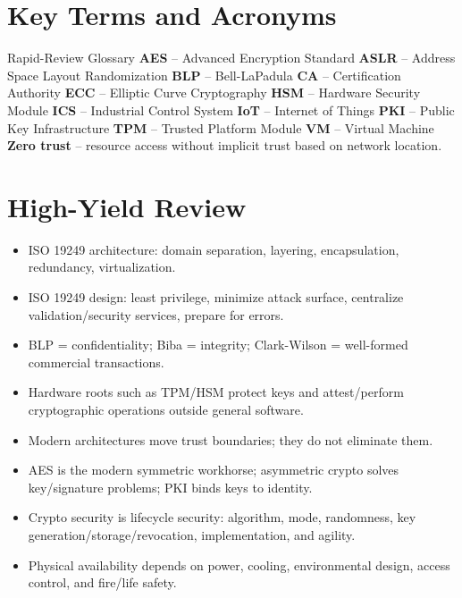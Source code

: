 \documentclass[10pt,letterpaper]{article}
\begin{document}
\section{\color{navy}Key Terms and Acronyms}
\begin{summarybox}{Rapid-Review Glossary}
\textbf{AES} -- Advanced Encryption Standard \quad
\textbf{ASLR} -- Address Space Layout Randomization \quad
\textbf{BLP} -- Bell-LaPadula \quad
\textbf{CA} -- Certification Authority \quad
\textbf{ECC} -- Elliptic Curve Cryptography \quad
\textbf{HSM} -- Hardware Security Module \quad
\textbf{ICS} -- Industrial Control System \quad
\textbf{IoT} -- Internet of Things \quad
\textbf{PKI} -- Public Key Infrastructure \quad
\textbf{TPM} -- Trusted Platform Module \quad
\textbf{VM} -- Virtual Machine \quad
\textbf{Zero trust} -- resource access without implicit trust based on network location.
\end{summarybox}

\section{\color{navy}High-Yield Review}
\begin{itemize}
\item ISO 19249 architecture: domain separation, layering, encapsulation, redundancy, virtualization.
\item ISO 19249 design: least privilege, minimize attack surface, centralize validation/security services, prepare for errors.
\item BLP = confidentiality; Biba = integrity; Clark-Wilson = well-formed commercial transactions.
\item Hardware roots such as TPM/HSM protect keys and attest/perform cryptographic operations outside general software.
\item Modern architectures move trust boundaries; they do not eliminate them.
\item AES is the modern symmetric workhorse; asymmetric crypto solves key/signature problems; PKI binds keys to identity.
\item Crypto security is lifecycle security: algorithm, mode, randomness, key generation/storage/revocation, implementation, and agility.
\item Physical availability depends on power, cooling, environmental design, access control, and fire/life safety.
\end{itemize}
\end{document}
